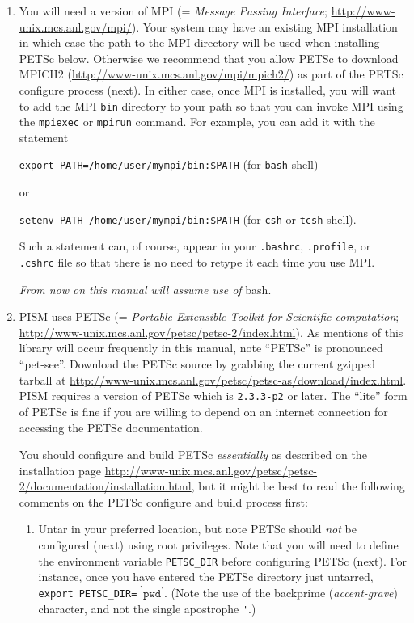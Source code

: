\documentclass[11pt,final]{amsart}
\newcommand{\PETSCREV}{2.3.3-p2}
\begin{document}
\begin{enumerate}
\item You will need a version of MPI (= \emph{Message Passing Interface}; \url{http://www-unix.mcs.anl.gov/mpi/}).  Your system may have an existing MPI installation in which case the path to the MPI directory will be used when installing PETSc below.  Otherwise we recommend that you allow PETSc to download MPICH2 (\url{http://www-unix.mcs.anl.gov/mpi/mpich2/}) as part of the PETSc configure process (next).  In either case, once MPI is installed, you will want to add the MPI \verb|bin| directory to your path so that you can invoke MPI using the \verb|mpiexec| or \verb|mpirun| command.  For example, you can add it with the statement

\verb|export PATH=/home/user/mympi/bin:$PATH|  \qquad (for \verb|bash| shell)

\noindent or

\verb|setenv PATH /home/user/mympi/bin:$PATH|  \qquad (for \verb|csh| or \verb|tcsh| shell).

\noindent Such a statement can, of course, appear in your \verb|.bashrc|, \verb|.profile|, or \verb|.cshrc| file so that there is no need to retype it each time you use MPI.

\medskip
\centerline{\emph{From now on this manual will assume use of} bash.}
\medskip

\item PISM uses PETSc (= \emph{Portable Extensible Toolkit for Scientific computation}; \url{http://www-unix.mcs.anl.gov/petsc/petsc-2/index.html}).  As mentions of this library will occur frequently in this manual, note ``PETSc'' is pronounced ``pet-see''.  Download the PETSc source by grabbing the current gzipped tarball at \url{http://www-unix.mcs.anl.gov/petsc/petsc-as/download/index.html}.  PISM requires a version of PETSc which is \texttt{\PETSCREV} or later.   The ``lite'' form of PETSc is fine if you are willing to depend on an internet connection for accessing the PETSc documentation. 

You should configure and build PETSc \emph{essentially} as described on the installation page \url{http://www-unix.mcs.anl.gov/petsc/petsc-2/documentation/installation.html}, but it might be best to read the following comments on the PETSc configure and build process first:

\renewcommand{\labelenumii}{(\roman{enumii})}\begin{enumerate}
\item Untar in your preferred location, but note PETSc should \emph{not} be configured (next) using root privileges.  Note that you will need to define the environment variable \verb|PETSC_DIR| before configuring PETSc (next).  For instance, once you have entered the PETSc directory just untarred, \verb|export PETSC_DIR=|$\phantom{!}^\backprime \mathtt{pwd}^\backprime$.  (Note the use of the backprime (\emph{accent-grave}) character, and not the single apostrophe \verb|'|.)


\end{enumerate}
\end{enumerate}
\end{document}
